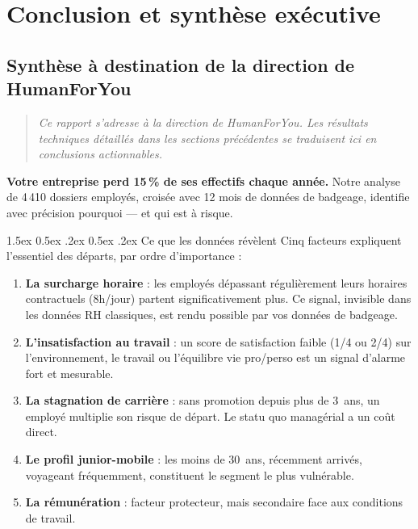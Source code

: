 \documentclass[12pt,a4paper]{article}
\makeatletter
\renewcommand\paragraph{\@startsection{paragraph}{4}{\z@}%
  {1.5ex \@plus 0.5ex \@minus .2ex}%
  {0.5ex \@plus .2ex}%
  {\normalfont\normalsize\bfseries}}
\makeatother
\begin{document}
\section{Conclusion et synthèse exécutive}

\subsection*{Synthèse à destination de la direction de HumanForYou}

\begin{quote}
\textit{Ce rapport s'adresse à la direction de HumanForYou.
Les résultats techniques détaillés dans les sections précédentes
se traduisent ici en conclusions actionnables.}
\end{quote}

\textbf{Votre entreprise perd 15\,\% de ses effectifs chaque année.}
Notre analyse de 4\,410 dossiers employés, croisée avec 12 mois
de données de badgeage, identifie avec précision pourquoi --- et
qui est à risque.

\paragraph{Ce que les données révèlent} Cinq facteurs expliquent
l'essentiel des départs, par ordre d'importance :
\begin{enumerate}
    \item \textbf{La surcharge horaire} : les employés dépassant
    régulièrement leurs horaires contractuels (8h/jour) partent
    significativement plus. Ce signal, invisible dans les données RH
    classiques, est rendu possible par vos données de badgeage.
    \item \textbf{L'insatisfaction au travail} : un score de
    satisfaction faible (1/4 ou 2/4) sur l'environnement, le
    travail ou l'équilibre vie pro/perso est un signal d'alarme
    fort et mesurable.
    \item \textbf{La stagnation de carrière} : sans promotion depuis
    plus de 3~ans, un employé multiplie son risque de départ.
    Le statu quo managérial a un coût direct.
    \item \textbf{Le profil junior-mobile} : les moins de 30~ans,
    récemment arrivés, voyageant fréquemment, constituent le segment
    le plus vulnérable.
    \item \textbf{La rémunération} : facteur protecteur, mais
    secondaire face aux conditions de travail.
\end{enumerate}
\end{document}
